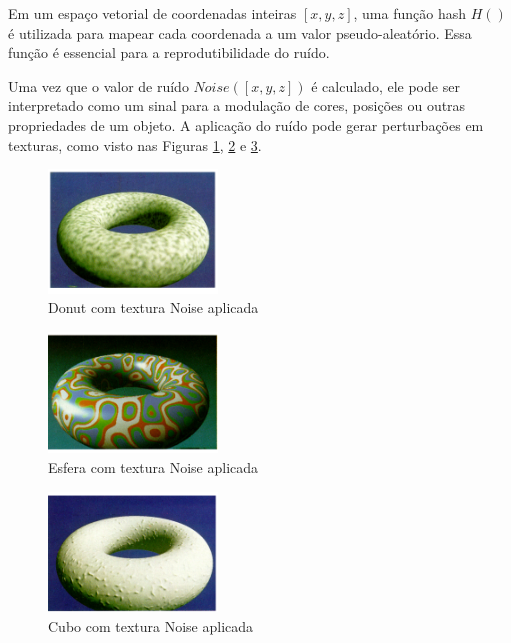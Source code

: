 Em um espaço vetorial de coordenadas inteiras $[x, y, z]$, uma função hash $H()$ é utilizada para mapear cada coordenada a um valor pseudo-aleatório. Essa função é essencial para a reprodutibilidade do ruído.

Uma vez que o valor de ruído $Noise([x, y, z])$ é calculado, ele pode ser interpretado como um sinal para a modulação de cores, posições ou outras propriedades de um objeto. A aplicação do ruído pode gerar perturbações em texturas, como visto nas Figuras \ref{fig:donut_noise}, \ref{fig:sphere_noise} e \ref{fig:cube_noise}.

\begin{figure}[H]
    \centering
    \includegraphics[width=0.4\textwidth]{img/donut.png}
    \caption{Donut com textura Noise aplicada}
    \label{fig:donut_noise}
\end{figure}

\begin{figure}[H]
    \centering
    \includegraphics[width=0.4\textwidth]{img/donut2.png}
    \caption{Esfera com textura Noise aplicada}
    \label{fig:sphere_noise}
\end{figure}

\begin{figure}[H]
    \centering
    \includegraphics[width=0.4\textwidth]{img/donut3.png}
    \caption{Cubo com textura Noise aplicada}
    \label{fig:cube_noise}
\end{figure}

